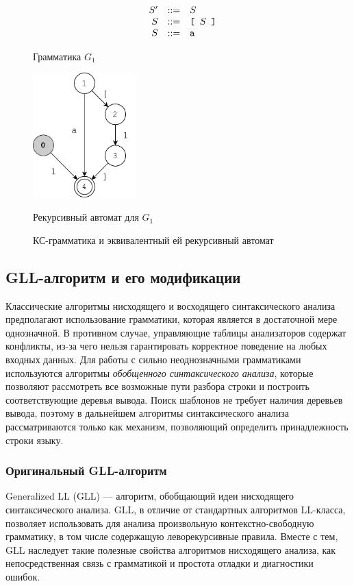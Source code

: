 \begin{figure}[h]
	\centering
		$$
		\begin{array}{crcl}
		&S' & ::= & S \\
		&S  & ::= & \texttt{[ } S \texttt{ ]}\\
		&S  & ::= & \mbox{\texttt{a}}
		\end{array}
		$$
		\caption{Грамматика $G_1$}
\end{figure}
\begin{figure}[h]
	\centering
		\centering
		\includegraphics[width=4cm]{Kovalev/pictures/ra_example.pdf}
		\caption{Рекурсивный автомат для $G_1$}
	\caption{КС-грамматика и эквивалентный ей рекурсивный автомат}
	\label{fig:ra_ex}
\end{figure}

\subsection{GLL-алгоритм и его модификации}

Классические алгоритмы нисходящего и восходящего синтаксического анализа предполагают использование грамматики, которая является в достаточной мере однозначной. 
В противном случае, управляющие таблицы анализаторов содержат конфликты, из-за чего нельзя гарантировать корректное поведение на любых входных данных. 
Для работы с сильно неоднозначными грамматиками используются алгоритмы \textit{обобщенного синтаксического анализа}, которые позволяют рассмотреть все возможные пути разбора строки и построить соответствующие деревья вывода.
Поиск шаблонов не требует наличия деревьев вывода, поэтому в дальнейшем алгоритмы синтаксического анализа рассматриваются только как механизм, позволяющий определить принадлежность строки языку.

\subsubsection{Оригинальный GLL-алгоритм}

Generalized LL (GLL) --- алгоритм, обобщающий идеи нисходящего синтаксического анализа. GLL, в отличие от стандартных алгоритмов LL-класса, позволяет использовать для анализа произвольную \linebreak контекстно-свободную грамматику, в том числе содержащую леворекурсивные правила. Вместе с тем, GLL наследует такие полезные свойства алгоритмов нисходящего анализа, как непосредственная связь с грамматикой и простота отладки и диагностики ошибок.

